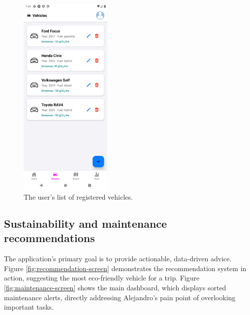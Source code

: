 \begin{figure}[H]
    \centering
    \includegraphics[width=0.4\textwidth]{images/mobile/vehicle-list.png}
    \caption{The user's list of registered vehicles.}
    \label{fig:vehicle-list}
\end{figure}

\subsection{Sustainability and maintenance recommendations}
The application's primary goal is to provide actionable, data-driven advice. Figure \ref{fig:recommendation-screen} demonstrates the recommendation system in action, suggesting the most eco-friendly vehicle for a trip. Figure \ref{fig:maintenance-screen} shows the main dashboard, which displays sorted maintenance alerts, directly addressing Alejandro's pain point of overlooking important tasks.

